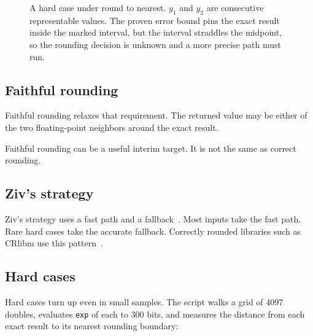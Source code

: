 \documentclass[manuscript, nonacm]{acmart}
\begin{document}
  \begin{figure}[tbp]
    \centering
    \caption{A hard case under round to nearest.  $y_1$ and $y_2$ are
    consecutive representable values. The proven error bound pins the
    exact result inside the marked interval, but the interval straddles the
    midpoint, so the rounding decision is unknown and a more precise path
    must run.}
    \label{fig:tmd}
  \end{figure}

  \subsection{Faithful rounding}

  Faithful rounding relaxes that requirement. The returned value may be either
  of the two floating-point neighbors around the exact result.

  Faithful rounding can be a useful interim target. It is not the same as
  correct rounding.

  \subsection{Ziv's strategy}

  Ziv's strategy uses a fast path and a
  fallback~\cite{ziv1991,muller,handbook}. Most inputs take the fast path.
  Rare hard cases take the accurate fallback. Correctly rounded libraries
  such as CRlibm use this pattern~\cite{crlibm}.

  \subsection{Hard cases}

  Hard cases turn up even in small samples. The script
  walks a grid of 4097 doubles, evaluates \texttt{exp} of each to 300 bits,
  and measures the distance from each exact result to its nearest rounding
  boundary:
\end{document}

